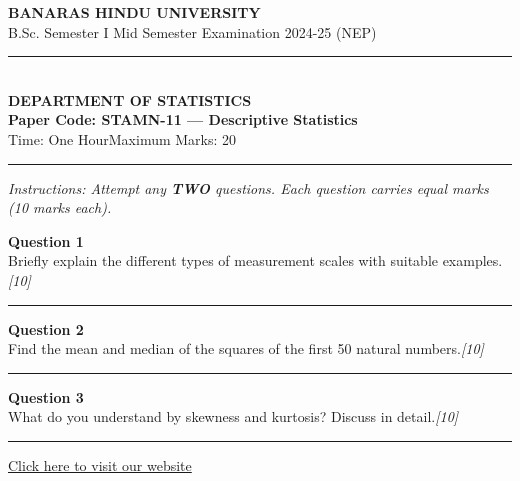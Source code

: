 \documentclass[11pt,a4paper]{article}
\newcommand{\pts}[1]{\hfill   \textit{[#1]}}
\begin{document}
\begin{center}
  {\large\bfseries BANARAS HINDU UNIVERSITY}\\[2pt]
  {\normalsize B.Sc. Semester I Mid Semester Examination 2024-25 (NEP)}\\[6pt]
  \rule{0.8\linewidth}{0.5pt}\\[6pt]
  {\large\bfseries DEPARTMENT OF STATISTICS}\\[4pt]
  {\large\bfseries Paper Code: STAMN-11 --- Descriptive Statistics}\\[4pt]
  {\normalsize Time: One Hour\hfill Maximum Marks: 20}
\end{center}

\rule{\linewidth}{0.4pt}\smallskip



\noindent   \textit{Instructions: Attempt any   \textbf{TWO} questions. Each question carries equal marks (10 marks each).}
\bigskip




\noindent   \textbf{Question 1} \\
Briefly explain the different types of measurement scales with suitable examples.\pts{10}

\medskip\rule{\linewidth}{0.2pt}\medskip




\noindent   \textbf{Question 2} \\
Find the mean and median of the squares of the first 50 natural numbers.\pts{10}

\medskip\rule{\linewidth}{0.2pt}\medskip




\noindent   \textbf{Question 3} \\
What do you understand by skewness and kurtosis? Discuss in detail.\pts{10}

\vfill\rule{\linewidth}{0.4pt}

\begin{center}\small\href{https://bhu-exam.vercel.app/}{Click here to visit our website}\end{center}
\end{document}
